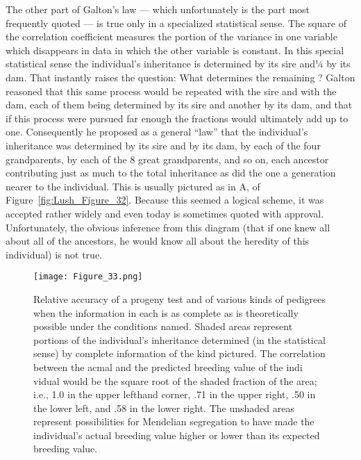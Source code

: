{The other part of Galton's law --- which unfortunately is the part
most frequently quoted --- is true only in a specialized statistical sense.
The square of the correlation coefficient measures the portion of the
variance in one variable which disappears in data in which the other
variable is constant. In this special statistical sense the individual's
inheritance is  determined by its sire and¼ by its dam. That instantly
raises the question: What determines the remaining ? Galton reasoned
that this same process would be repeated with the sire and with
the dam, each of them being  determined by its sire and another 
by its dam, and that if this process were pursued far enough the fractions
would ultimately add up to one. Consequently he proposed as a
general ``law'' that the individual's inheritance was  determined by
its sire and  by its dam,  by each of the
four grandparents,  by each of the 8 great grandparents, and
so on, each ancestor contributing just  as much to the total
inheritance as did the one a generation nearer to the individual. This is
usually pictured as in A, of Figure~\ref{fig:Lush_Figure_32}. Because this
seemed a logical scheme, it was accepted rather widely
and even today is sometimes quoted with approval. Unfortunately, the
obvious inference from this diagram (that if one knew all about all of
the ancestors, he would know all about the heredity of this individual)
is not true.

\begin{figure}[!htbp]
	\centering
    \texttt{[image: Figure\_33.png]}
    \caption{Relative accuracy of a progeny test and of various kinds of pedigrees
			 when the information in each is as complete as is theoretically possible under the
			 conditions named. Shaded areas represent portions of the individual's inheritance
			 determined (in the statistical sense) by complete information of the kind pictured.
			 The correlation between the acmal and the predicted breeding value of the indi vidual
			 would be the square root of the shaded fraction of the area; i.e., 1.0 in the
			 upper lefthand corner, .71 in the upper right, .50 in the lower left, and .58 in the
			 lower right. The unshaded areas represent possibilities for Mendelian segregation to
			 have made the individual's actual breeding value higher or lower than its expected
			 breeding value.}
    \label{fig:Lush_Figure_33}
\end{figure}

}
